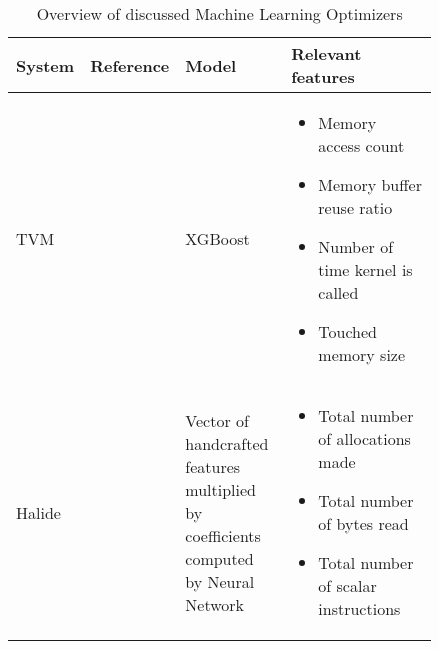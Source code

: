 \begin{table}[ht]
	\centering
	\begin{tabular}{p{0.15\linewidth}p{0.09\linewidth}p{0.25\linewidth}p{0.35\linewidth}}
		\toprule
		System & Reference                & Model                                                                                & Relevant features                                                                                                                                                                              \\ \midrule \midrule

		TVM    & \cite{tvm}               & XGBoost                                                                              & \begin{itemize}[noitemsep,topsep=0pt,leftmargin=0.3cm] \item Memory access count \item Memory buffer reuse ratio \item Number of time kernel is called \item Touched memory size \end{itemize} \\ \midrule
		Halide & \cite{halide_cost_model} & Vector of handcrafted features multiplied by coefficients computed by Neural Network & \begin{itemize}[noitemsep,topsep=0pt,leftmargin=0.3cm] \item Total number of allocations made \item Total number of bytes read \item Total number of scalar instructions \end{itemize}         \\ \bottomrule
	\end{tabular}
	\caption{Overview of discussed Machine Learning Optimizers}
	\label{tab:optimizer_overview}
\end{table}

